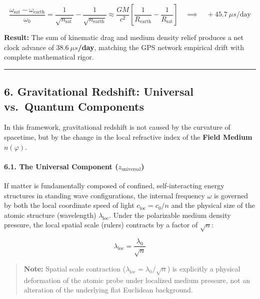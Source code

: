 \documentclass[
]{article}
\begin{document}
\[ \frac{\omega_{\text{sat}} - \omega_{\text{earth}}}{\omega_0} = \frac{1}{\sqrt{n_{\text{sat}}}} - \frac{1}{\sqrt{n_{\text{earth}}}} \approx \frac{GM}{c^2} \left[ \frac{1}{R_{\text{earth}}} - \frac{1}{R_{\text{sat}}} \right] \quad \implies \quad +45.7 \ \mu s\text{/day} \]

\textbf{Result:} The sum of kinematic drag and medium density relief
produces a net clock advance of \textbf{\(38.6 \ \mu s\)/day}, matching
the GPS network empirical drift with complete mathematical rigor.

\begin{center}\rule{0.5\linewidth}{0.5pt}\end{center}

\subsection{6. Gravitational Redshift: Universal vs.~Quantum
Components}\label{gravitational-redshift-universal-vs.-quantum-components}

In this framework, gravitational redshift is not caused by the curvature
of spacetime, but by the change in the local refractive index of the
\textbf{Field Medium} \(n(\varphi)\).

\paragraph{\texorpdfstring{6.1. The Universal Component
(\(z_{\text{universal}}\))}{6.1. The Universal Component (z\_\{\textbackslash text\{universal\}\})}}\label{the-universal-component-z_textuniversal}

If matter is fundamentally composed of confined, self-interacting energy
structures in standing wave configurations, the internal frequency
\(\omega\) is governed by both the local coordinate speed of light
\(c_{\text{loc}} = c_0/n\) and the physical size of the atomic structure
(wavelength) \(\lambda_{\text{loc}}\). Under the polarizable medium
density pressure, the local spatial scale (rulers) contracts by a factor
of \(\sqrt{n}\):

\[ \lambda_{\text{loc}} = \frac{\lambda_0}{\sqrt{n}} \]

\begin{quote}
\textbf{Note:} Spatial scale contraction
(\(\lambda_{\text{loc}} = \lambda_0/\sqrt{n}\)) is explicitly a physical
deformation of the atomic probe under localized medium pressure, not an
alteration of the underlying flat Euclidean background.
\end{quote}
\end{document}
